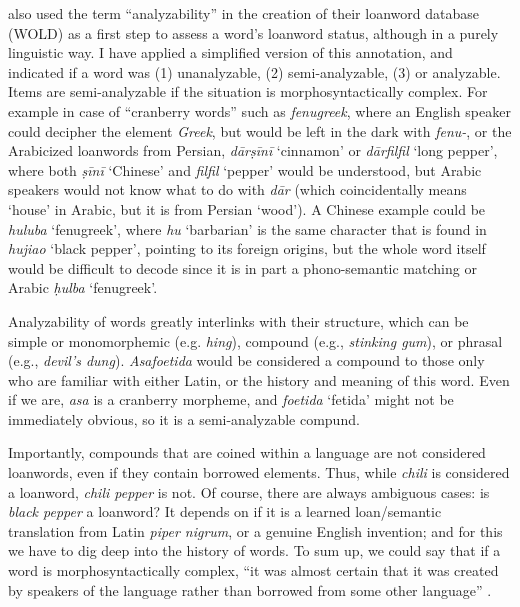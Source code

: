 \textcite[12]{haspelmath_loanwords_2009} also used the term ``analyzability'' in the creation of their loanword database (\gls{WOLD}) as a first step to assess a word's loanword status, although in a purely linguistic way. I have applied a simplified version of this annotation, and indicated if a word was (1) unanalyzable, (2) semi-analyzable, (3) or analyzable. Items are semi-analyzable if the situation is morphosyntactically complex. For example in case of ``cranberry words'' such as \textit{fenugreek}, where an English speaker could decipher the element \textit{Greek}, but would be left in the dark with \textit{fenu-}, or the Arabicized loanwords from Persian, \textit{dārṣīnī} `cinnamon' or \textit{dārfilfil} `long pepper', where both \textit{ṣīnī} `Chinese' and \textit{filfil} `pepper' would be understood, but Arabic speakers would not know what to do with \textit{dār} (which coincidentally means `house' in Arabic, but it is from Persian `wood'). A Chinese example could be \textit{huluba} `fenugreek', where \textit{hu} `barbarian' is the same character that is found in \textit{hujiao} `black pepper', pointing to its foreign origins, but the whole word itself would be difficult to decode since it is in part a phono-semantic matching or Arabic \textit{ḥulba} `fenugreek'.

Analyzability of words greatly interlinks with their structure, which can be simple or monomorphemic (e.g. \textit{hing}), compound (e.g., \textit{stinking gum}), or phrasal (e.g., \textit{devil's dung}). \textit{Asafoetida} would be considered a compound to those only who are familiar with either Latin, or the history and meaning of this word. Even if we are, \textit{asa} is a cranberry morpheme, and \textit{foetida} `fetida' might not be immediately obvious, so it is a semi-analyzable compund. 

Importantly, compounds that are coined within a language are not considered loanwords, even if they contain borrowed elements. Thus, while \textit{chili} is considered a loanword, \textit{chili pepper} is not. Of course, there are always ambiguous cases: is \textit{black pepper} a loanword? It depends on if it is a learned loan/semantic translation from Latin \textit{piper nigrum}, or a genuine English invention; and for this we have to dig deep into the history of words. To sum up, we could say that if a word is morphosyntactically complex, ``it was almost certain that it was created by speakers of the language rather than borrowed from some other language'' \autocite[12]{haspelmath_loanwords_2009}. 

